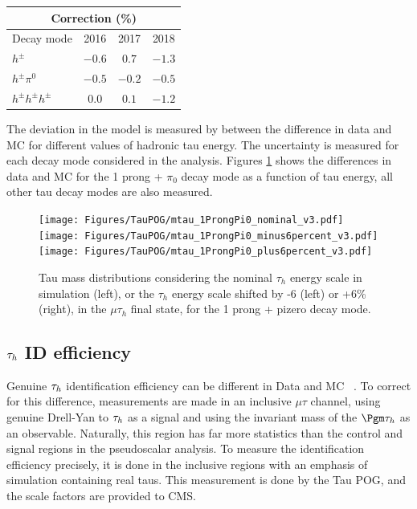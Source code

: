 \begin{table}[h]
  \begin{center}
    \label{tab:TES}
    \begin{tabular} { l | c  c  c }
      \hline \multicolumn{4}{c}{Correction (\%)} \\
      \hline Decay mode & 2016 & 2017 & 2018 \\ \hline
      $h^{\pm}$ & $-0.6$ & $0.7$ & $-1.3$  \\ 
      $h^{\pm}\pi^{0}$ & $-0.5$ & $-0.2$ & $-0.5$  \\ 
      $h^{\pm}h^{\pm}h^{\pm}$ & $0.0$ & $0.1$ & $-1.2$ \\ 
    \end{tabular}
  \end{center}
\end{table}

The deviation in the model is measured by between the difference in data and MC for different values of hadronic tau energy. The uncertainty is measured for each decay mode considered in the analysis. Figures \ref{fig:taues} shows the differences in data and MC for the 1 prong + $\pi_0$ decay mode as a function of tau energy, all other tau decay modes are also measured. 

\begin{figure}[h!]
    \begin{center}
        \texttt{[image: Figures/TauPOG/mtau\_1ProngPi0\_nominal\_v3.pdf]}
        \texttt{[image: Figures/TauPOG/mtau\_1ProngPi0\_minus6percent\_v3.pdf]}
        \texttt{[image: Figures/TauPOG/mtau\_1ProngPi0\_plus6percent\_v3.pdf]}
    \end{center}
    \caption{Tau mass distributions considering the nominal $\tau_h$ energy scale in simulation (left), or the $\tau_h$ energy scale shifted by -6 (left) or +6\% (right), in the $\mu\tau_h$ final state, for the 1 prong + pizero decay mode.}
    \label{fig:taues}
\end{figure}

\subsection{$\tau_h$ ID efficiency}

Genuine $\tau_h$ identification efficiency can be different in Data and MC ~\cite{TAUIDTwiki}. To correct for this difference, measurements are 
made in an inclusive $\mu\tau$ channel, using genuine Drell-Yan to $\tau_h$ as a signal and using the invariant mass
of the $\Pgm\tauh$ as an observable. Naturally, this region has far more statistics than the control and signal regions in the pseudoscalar analysis. To measure the identification efficiency precisely, it is done in the inclusive regions with an emphasis of simulation containing real taus. This measurement is done by the Tau POG, and the scale factors are provided to CMS. 

